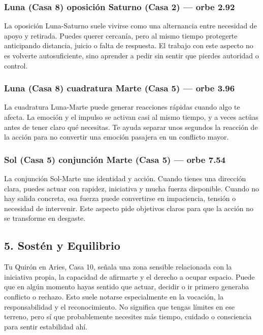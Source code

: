 \documentclass[11pt,a4paper]{article}\usepackage[utf8]{inputenc}
\begin{document}
\subsubsection*{Luna (Casa 8) oposición Saturno (Casa 2) --- orbe 2.92\textdegree}
La oposición Luna-Saturno suele vivirse como una alternancia entre necesidad de apoyo y retirada. Puedes querer cercanía, pero al mismo tiempo protegerte anticipando distancia, juicio o falta de respuesta. El trabajo con este aspecto no es volverte autosuficiente, sino aprender a pedir sin sentir que pierdes autoridad o control.

\subsubsection*{Luna (Casa 8) cuadratura Marte (Casa 5) --- orbe 3.96\textdegree}
La cuadratura Luna-Marte puede generar reacciones rápidas cuando algo te afecta. La emoción y el impulso se activan casi al mismo tiempo, y a veces actúas antes de tener claro qué necesitas. Te ayuda separar unos segundos la reacción de la acción para no convertir una emoción pasajera en un conflicto mayor.

\subsubsection*{Sol (Casa 5) conjunción Marte (Casa 5) --- orbe 7.54\textdegree}
La conjunción Sol-Marte une identidad y acción. Cuando tienes una dirección clara, puedes actuar con rapidez, iniciativa y mucha fuerza disponible. Cuando no hay salida concreta, esa fuerza puede convertirse en impaciencia, tensión o necesidad de intervenir. Este aspecto pide objetivos claros para que la acción no se transforme en desgaste.



\vspace{0.8cm}

\subsection{5. Sostén y Equilibrio}

Tu Quirón en Aries, Casa 10, señala una zona sensible relacionada con la iniciativa propia, la capacidad de afirmarte y el derecho a ocupar espacio. Puede que en algún momento hayas sentido que actuar, decidir o ir primero generaba conflicto o rechazo. Esto suele notarse especialmente en la vocación, la responsabilidad y el reconocimiento. No significa que tengas límites en ese terreno, pero sí que probablemente necesites más tiempo, cuidado o consciencia para sentir estabilidad ahí.
\end{document}
